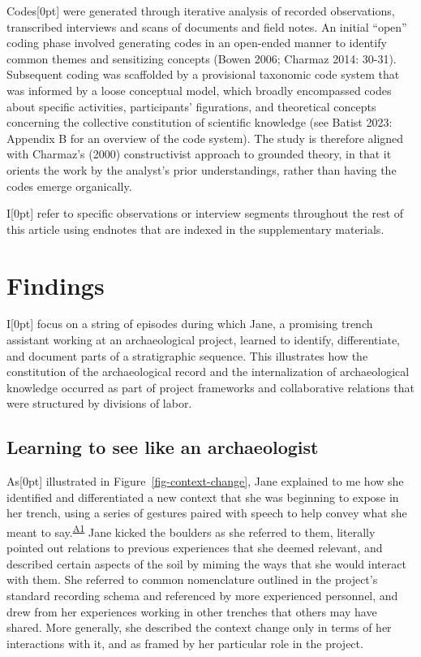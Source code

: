 \documentclass[
]{article}
\newcommand{\paragraphnumber}[1]{\marginnote{\color{lightgray}\tiny{#1}}[0pt]}
\begin{document}
Codes\paragraphnumber{[23]} were generated through iterative analysis of
recorded observations, transcribed interviews and scans of documents and
field notes. An initial ``open'' coding phase involved generating codes
in an open-ended manner to identify common themes and sensitizing
concepts (Bowen 2006; Charmaz 2014: 30-31). Subsequent coding was
scaffolded by a provisional taxonomic code system that was informed by a
loose conceptual model, which broadly encompassed codes about specific
activities, participants' figurations, and theoretical concepts
concerning the collective constitution of scientific knowledge (see
Batist 2023: Appendix B for an overview of the code system). The study
is therefore aligned with Charmaz's (2000) constructivist approach to
grounded theory, in that it orients the work by the analyst's prior
understandings, rather than having the codes emerge organically.

I\paragraphnumber{[24]} refer to specific observations or interview
segments throughout the rest of this article using endnotes that are
indexed in the supplementary materials.

\section{Findings}\label{findings}

I\paragraphnumber{[25]} focus on a string of episodes during which Jane,
a promising trench assistant working at an archaeological project,
learned to identify, differentiate, and document parts of a
stratigraphic sequence. This illustrates how the constitution of the
archaeological record and the internalization of archaeological
knowledge occurred as part of project frameworks and collaborative
relations that were structured by divisions of labor.

\subsection{Learning to see like an
archaeologist}\label{learning-to-see-like-an-archaeologist}

As\paragraphnumber{[26]} illustrated in Figure~\ref{fig-context-change},
Jane explained to me how she identified and differentiated a new context
that she was beginning to expose in her trench, using a series of
gestures paired with speech to help convey what she meant to
say.\textsuperscript{\hyperref[sec-A1]{A1}} Jane kicked the boulders as
she referred to them, literally pointed out relations to previous
experiences that she deemed relevant, and described certain aspects of
the soil by miming the ways that she would interact with them. She
referred to common nomenclature outlined in the project's standard
recording schema and referenced by more experienced personnel, and drew
from her experiences working in other trenches that others may have
shared. More generally, she described the context change only in terms
of her interactions with it, and as framed by her particular role in the
project.
\end{document}

